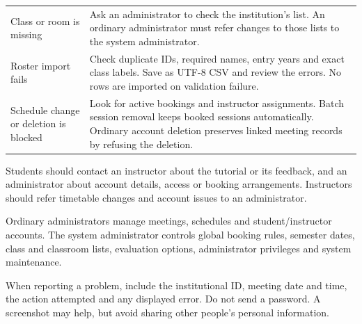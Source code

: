 \documentclass[11pt,a4paper]{article}
\newcommand{\subhead}[1]{\par\vspace{2mm}{\large\bfseries #1\par}\vspace{0.5mm}}
\begin{document}
\begin{tabularx}{\linewidth}{@{}L{48mm}Y@{}}
\addlinespace[0.9mm]
Class or room is missing & Ask an administrator to check the institution’s list. An ordinary administrator must refer changes to those lists to the system administrator.\\
\addlinespace[0.9mm]
Roster import fails & Check duplicate IDs, required names, entry years and exact class labels. Save as UTF-8 CSV and review the errors. No rows are imported on validation failure.\\
\addlinespace[0.9mm]
Schedule change or deletion is blocked & Look for active bookings and instructor assignments. Batch session removal keeps booked sessions automatically. Ordinary account deletion preserves linked meeting records by refusing the deletion.\\
\bottomrule
\end{tabularx}

\subhead{Ask the right person}
Students should contact an instructor about the tutorial or its feedback, and an administrator about account details, access or booking arrangements. Instructors should refer timetable changes and account issues to an administrator.

Ordinary administrators manage meetings, schedules and student/instructor accounts. The system administrator controls global booking rules, semester dates, class and classroom lists, evaluation options, administrator privileges and system maintenance.

When reporting a problem, include the institutional ID, meeting date and time, the action attempted and any displayed error. Do not send a password. A screenshot may help, but avoid sharing other people’s personal information.
\end{document}
